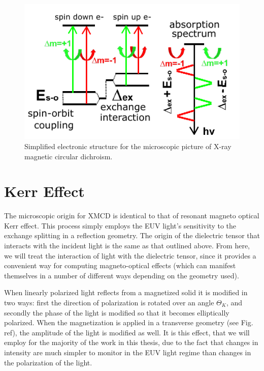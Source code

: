 \begin{figure}
\begin{center}
	\includegraphics[width=150mm]{figs/XMCDMicroscopic.pdf}
\end{center}
\caption{Simplified electronic structure for the microscopic picture of X-ray magnetic circular dichroism. }
\label{XMCDMicroscopic}
\end{figure}

\section{Kerr Effect}

The microscopic origin for XMCD is identical to that of resonant magneto optical Kerr effect. This process simply employs the EUV light's sensitivity to the exchange splitting in a reflection geometry. The origin of the dielectric tensor that interacts with the incident light is the same as that outlined above. From here, we will treat the interaction of light with the dielectric tensor, since it provides a convenient way for computing magneto-optical effects (which can manifest themselves in a number of different ways depending on the geometry used).

When linearly polarized light reflects from a magnetized solid it is modified in two ways: first the direction of polarization is rotated over an angle $\Theta_K$, and secondly the phase of the light is modified so that it becomes elliptically polarized. When the magnetization is applied in a transverse geometry (see Fig. ref), the amplitude of the light is modified as well. It is this effect, that we will employ for the majority of the work in this thesis, due to the fact that changes in intensity are much simpler to monitor in the EUV light regime than changes in the polarization of the light.

